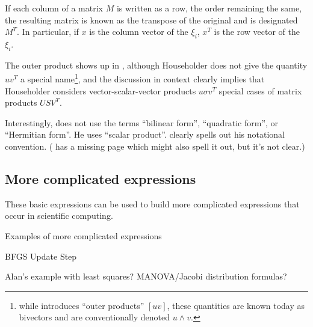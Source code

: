 If each column of a matrix $M$ is written as a row, the order remaining the
same, the resulting matrix is known as the transpose of the original and is
designated $M^T$. In particular, if $x$ is the column vector of the $\xi_i$,
$x^T$ is the row vector of the $\xi_i$.

The outer product shows up in \cite[Sec. 2.24]{Householder1953}, although
Householder does not give the quantity $u v^T$ a special name\footnote{while
\cite[Sec. 2.03]{Householder1953} introduces ``outer products'' $[u v]$, these
quantities are known today as bivectors and are conventionally denoted $u
\wedge v$.}, and the discussion in context clearly implies that Householder
considers vector-scalar-vector products $u \sigma v^T$ special cases of matrix
products $U S V^T$.

Interestingly, \cite{Householder1953} does not use the terms ``bilinear form'',
``quadratic form'', or ``Hermitian form''. He uses ``scalar product''.
\cite{Householder1955} clearly spells out his notational convention.
(\cite{Householder1953} has a missing page which might also spell it out, but
it's not clear.)



\subsection{More complicated expressions}

These basic expressions can be used to build more complicated expressions that
occur in scientific computing.

Examples of more complicated expressions

BFGS Update Step

Alan's example with least squares? MANOVA/Jacobi distribution formulas?
